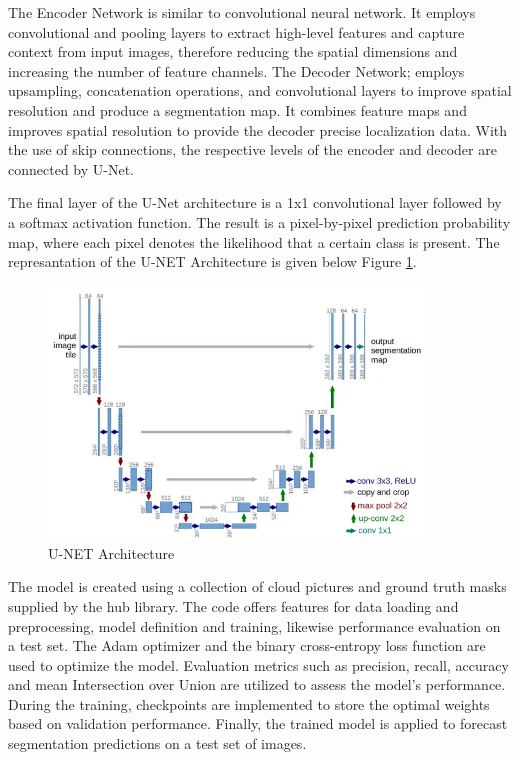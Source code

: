 The Encoder Network is similar to convolutional neural network. It employs convolutional and pooling layers to extract high-level features and capture context from input images, therefore reducing the spatial dimensions and increasing the number of feature channels. The Decoder Network; employs upsampling, concatenation operations, and convolutional layers to improve spatial resolution and produce a segmentation map. It combines feature maps and improves spatial resolution to provide the decoder precise localization data. With the use of skip connections, the respective levels of the encoder and decoder are connected by U-Net.

The final layer of the U-Net architecture is a 1x1 convolutional layer followed by a softmax activation function. The result is a pixel-by-pixel prediction probability map, where each pixel denotes the likelihood that a certain class is present. 
\newpage
The represantation of the U-NET Architecture is given below Figure \ref{unet}.
\begin{figure}[htp]
    \centering
    \includegraphics[width=10cm]{projectChapters/images/unet.png}
    \caption{U-NET Architecture}
    \label{unet}
\end{figure}

The model is created using a collection of cloud pictures and ground truth masks supplied by the hub library. The code offers features for data loading and preprocessing, model definition and training, likewise performance evaluation on a test set. The Adam optimizer and the binary cross-entropy loss function are used to optimize the model. Evaluation metrics such as precision, recall, accuracy and mean Intersection over Union are utilized to assess the model's performance. During the training, checkpoints are implemented to store the optimal weights based on validation performance. Finally, the trained model is applied to forecast segmentation predictions on a test set of images.


